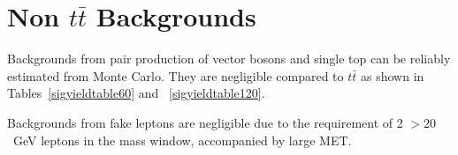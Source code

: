 \section{Non $t\bar{t}$ Backgrounds}
\label{sec:othBG}

Backgrounds from pair production of vector bosons and single top
can be reliably estimated from Monte Carlo.
They are negligible compared to $t\bar{t}$ as shown in Tables~\ref{sigyieldtable60} and ~\ref{sigyieldtable120}.

Backgrounds from fake leptons are negligible due to the requirement of 2 \pt$ > 20$~GeV leptons
in the \Z mass window, accompanied by large MET.



